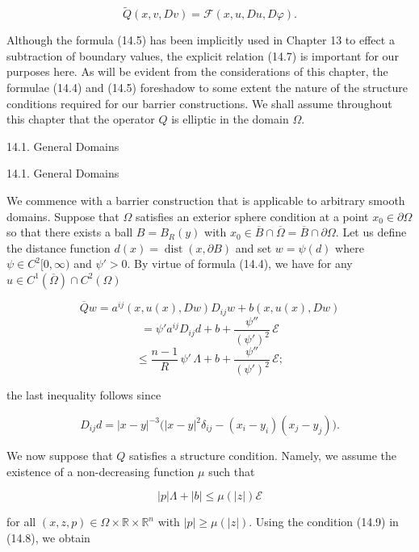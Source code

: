 \begin{equation}
\widetilde{Q}(x,v,Dv)=\mathcal F(x,u,Du,D\varphi).
\tag{14.7}
\end{equation}

Although the formula (14.5) has been implicitly used in Chapter 13 to effect a
subtraction of boundary values, the explicit relation (14.7) is important for our
purposes here. As will be evident from the considerations of this chapter, the
formulae (14.4) and (14.5) foreshadow to some extent the nature of the structure
conditions required for our barrier constructions. We shall assume throughout
this chapter that the operator $Q$ is elliptic in the domain $\Omega$.




14.1. General Domains

14.1. General Domains

We commence with a barrier construction that is applicable to arbitrary smooth
domains. Suppose that $\Omega$ satisfies an exterior sphere condition at a point
$x_0 \in \partial\Omega$ so that there exists a ball $B=B_R(y)$ with
$x_0 \in \overline{B} \cap \overline{\Omega} = \overline{B} \cap \partial\Omega$.
Let us define the distance function $d(x)=\operatorname{dist}(x,\partial B)$ and
set $w=\psi(d)$ where $\psi \in C^2[0,\infty)$ and $\psi'>0$. By virtue of
formula (14.4), we have for any $u \in C^1(\overline{\Omega}) \cap C^2(\Omega)$

\begin{equation}\tag{14.8}
\overline{Q}w
=a^{ij}(x,u(x),Dw)D_{ij}w+b(x,u(x),Dw)
\end{equation}
\[
=\psi' a^{ij}D_{ij}d+b+\frac{\psi''}{(\psi')^2}\,\mathcal{E}
\]
\[
\leq \frac{n-1}{R}\,\psi'\,\Lambda+b+\frac{\psi''}{(\psi')^2}\,\mathcal{E};
\]

the last inequality follows since

\[
D_{ij}d=|x-y|^{-3}\bigl(|x-y|^2\delta_{ij}-(x_i-y_i)(x_j-y_j)\bigr).
\]

We now suppose that $Q$ satisfies a structure condition. Namely, we assume the
existence of a non-decreasing function $\mu$ such that

\begin{equation}\tag{14.9}
|p|\Lambda+|b|\leq \mu(|z|)\mathcal{E}
\end{equation}

for all $(x,z,p)\in \Omega\times \mathbb{R}\times \mathbb{R}^n$ with
$|p|\geq \mu(|z|)$. Using the condition (14.9) in (14.8), we obtain

